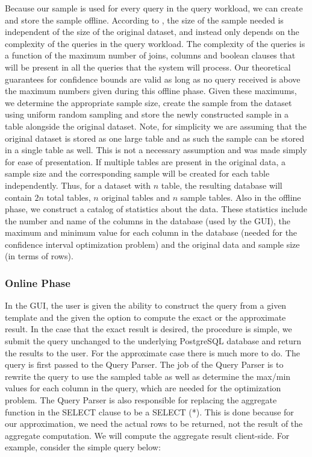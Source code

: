 \documentclass[11pt]{article}
\begin{document}
Because our sample is used for every query in the query workload, we
can create and store the sample offline. According to \cite{Matteo},
the size of the sample needed is independent of the size of the
original dataset, and instead only depends on the complexity of the
queries in the query workload. The complexity of the queries is a
function of the maximum number of joins, columns and boolean clauses
that will be present in all the queries that the system will
process. Our theoretical guarantees for confidence bounds are valid as
long as no query received is above the maximum numbers given during
this offline phase. Given these maximums, we determine the appropriate
sample size, create the sample from the dataset using uniform random
sampling and store the newly constructed sample in a table alongside
the original dataset. Note, for simplicity we are assuming that the
original dataset is stored as one large table and as such the sample
can be stored in a single table as well. This is not a necessary
assumption and was made simply for ease of presentation. If multiple
tables are present in the original data, a sample size and the
corresponding sample will be created for each table
independently. Thus, for a dataset with $n$ table, the resulting
database will contain $2n$ total tables, $n$ original tables and $n$
sample tables. Also in the offline phase, we construct a catalog of
statistics about the data.  These statistics include the number and
name of the columns in the database (used by the GUI), the maximum and
minimum value for each column in the database (needed for the
confidence interval optimization problem) and the original data and
sample size (in terms of rows).

\subsubsection{Online Phase}

In the GUI, the user is given the ability to construct the query from
a given template and the given the option to compute the exact or the
approximate result. In the case that the exact result is desired, the
procedure is simple, we submit the query unchanged to the
underlying PostgreSQL database and return the results to the user. For
the approximate case there is much more to do. The query is first
passed to the Query Parser. The job of the Query Parser is to rewrite
the query to use the sampled table as well as determine the max/min
values for each column in the query, which are needed for the
optimization problem. The Query Parser is also responsible for
replacing the aggregate function in the SELECT clause to be a SELECT
(*). This is done because for our approximation, we need the actual
rows to be returned, not the result of the aggregate computation. We
will compute the aggregate result client-side. For example, consider the simple query below: 
\end{document}
